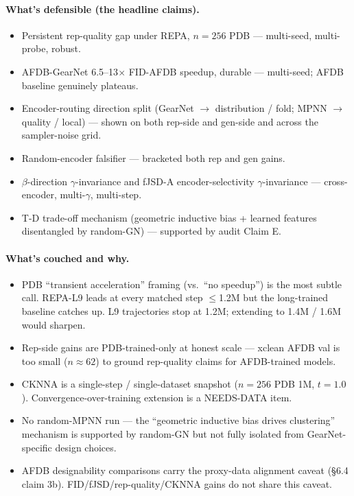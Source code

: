 \documentclass[11pt,a4paper]{article}
\begin{document}
\paragraph{What's defensible (the headline claims).}
\begin{itemize}[leftmargin=*,itemsep=0pt]
\item Persistent rep-quality gap under REPA, $n{=}256$ PDB --- multi-seed,
multi-probe, robust.
\item AFDB-GearNet 6.5--13$\times$ FID-AFDB speedup, durable ---
multi-seed; AFDB baseline genuinely plateaus.
\item Encoder-routing direction split (GearNet $\to$ distribution / fold;
MPNN $\to$ quality / local) --- shown on both rep-side and gen-side and
across the sampler-noise grid.
\item Random-encoder falsifier --- bracketed both rep and gen gains.
\item $\beta$-direction $\gamma$-invariance and fJSD-A encoder-selectivity
$\gamma$-invariance --- cross-encoder, multi-$\gamma$, multi-step.
\item T-D trade-off mechanism (geometric inductive bias + learned features
disentangled by random-GN) --- supported by audit Claim E.
\end{itemize}

\paragraph{What's couched and why.}
\begin{itemize}[leftmargin=*,itemsep=0pt]
\item PDB ``transient acceleration'' framing (vs.\ ``no speedup'') is
the most subtle call. REPA-L9 leads at every matched step $\le$1.2M
but the long-trained baseline catches up. L9 trajectories stop at
1.2M; extending to 1.4M / 1.6M would sharpen.
\item Rep-side gains are PDB-trained-only at honest scale --- xclean
AFDB val is too small ($n\approx 62$) to ground rep-quality claims for
AFDB-trained models.
\item CKNNA is a single-step / single-dataset snapshot ($n{=}256$ PDB
1M, $t{=}1.0$). Convergence-over-training extension is a NEEDS-DATA item.
\item No random-MPNN run --- the ``geometric inductive bias drives
clustering'' mechanism is supported by random-GN but not fully isolated
from GearNet-specific design choices.
\item AFDB designability comparisons carry the proxy-data alignment
caveat (\S6.4 claim 3b). FID/fJSD/rep-quality/CKNNA gains do not share
this caveat.
\end{itemize}
\end{document}
